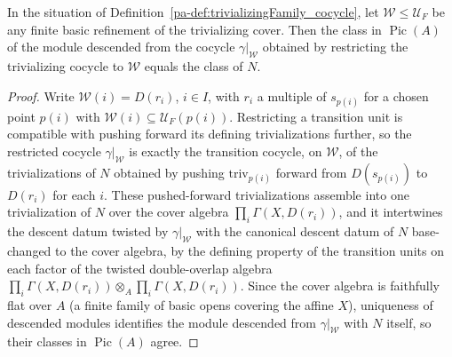 \begin{theorem}
  \label{pa-thm:trivializingFamily_pic_cocycle}
  \leanok

  In the situation of Definition~\ref{pa-def:trivializingFamily_cocycle}, let \(\mathcal W \le
  \mathcal U_F\) be any finite basic refinement of the trivializing cover. Then the class in
  \(\operatorname{Pic}(A)\) of the module descended from the cocycle \(\gamma|_{\mathcal W}\)
  obtained by restricting the trivializing cocycle to \(\mathcal W\) equals the class of \(N\).
\end{theorem}
\begin{proof}
  \leanok
  Write \(\mathcal W(i) = D(r_i)\), \(i \in I\), with \(r_i\) a multiple of \(s_{p(i)}\) for a
  chosen point \(p(i)\) with \(\mathcal W(i) \subseteq \mathcal U_F(p(i))\). Restricting a
  transition unit is compatible with pushing forward its defining trivializations further, so
  the restricted cocycle \(\gamma|_{\mathcal W}\) is exactly the transition cocycle, on
  \(\mathcal W\), of the trivializations of \(N\) obtained by pushing \(\mathrm{triv}_{p(i)}\)
  forward from \(D(s_{p(i)})\) to \(D(r_i)\) for each \(i\). These pushed-forward
  trivializations assemble into one trivialization of \(N\) over the cover algebra
  \(\prod_i \Gamma(X,D(r_i))\), and it intertwines the descent datum twisted by
  \(\gamma|_{\mathcal W}\) with the canonical descent datum of \(N\) base-changed to the cover
  algebra, by the defining property of the transition units on each factor of the twisted
  double-overlap algebra \(\prod_i \Gamma(X,D(r_i)) \otimes_A \prod_i \Gamma(X,D(r_i))\). Since
  the cover algebra is faithfully flat over \(A\) (a finite family of basic opens covering the
  affine \(X\)), uniqueness of descended modules identifies the module descended from
  \(\gamma|_{\mathcal W}\) with \(N\) itself, so their classes in \(\operatorname{Pic}(A)\)
  agree.
\end{proof}

